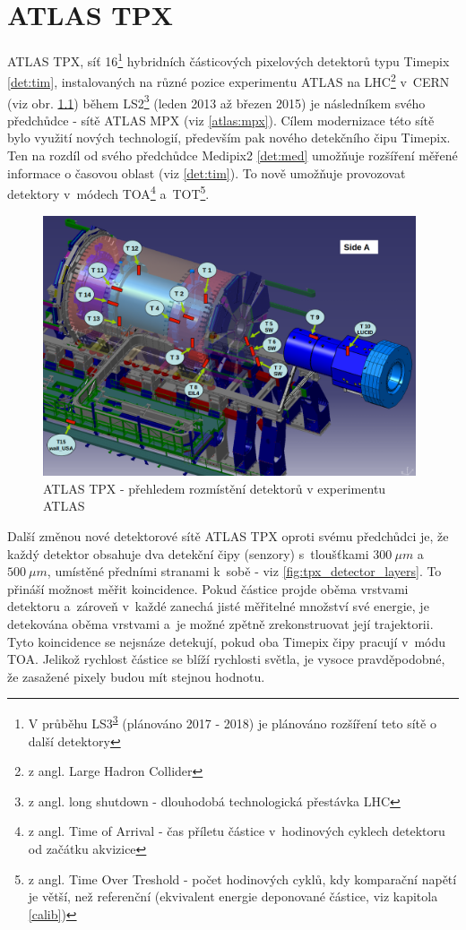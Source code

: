 

\chapter{ATLAS TPX}\label{atlas}
ATLAS TPX, síť 16\footnote{V průběhu LS3\textsuperscript{\ref{ls}} (plánováno 2017 - 2018) je plánováno rozšíření teto sítě o další detektory} hybridních částicových pixelových detektorů typu Timepix \ref{det:tim}, instalovaných na různé pozice experimentu ATLAS na LHC\footnote{z angl. Large Hadron Collider} v~CERN (viz obr. \ref{fig:tpx_positions}) během LS2\footnote{\label{ls}z angl. long shutdown - dlouhodobá technologická přestávka LHC} (leden 2013 až březen 2015) je následníkem svého předchůdce - sítě ATLAS MPX (viz \ref{atlas:mpx}). Cílem modernizace této sítě bylo využití nových technologií, především pak nového detekčního čipu Timepix. Ten na rozdíl od svého předchůdce Medipix2 \ref{det:med} umožňuje rozšíření měřené informace o časovou oblast (viz \ref{det:tim}). To nově umožňuje provozovat detektory v~módech TOA\footnote{z angl. Time of Arrival - čas příletu částice v~hodinových cyklech detektoru od začátku akvizice} a~TOT\footnote{z angl. Time Over Treshold - počet hodinových cyklů, kdy komparační napětí je větší, než referenční (ekvivalent energie deponované částice, viz kapitola \ref{calib})}. 


\begin{figure}[th!]
	\begin{center}
		\includegraphics[width=11cm]{figures/tpx_positions.png}
		\caption{ATLAS TPX - přehledem rozmístění detektorů v experimentu ATLAS}
		\label{fig:tpx_positions}
	\end{center}
\end{figure}


Další změnou nové detektorové sítě ATLAS TPX oproti svému předchůdci je, že každý detektor obsahuje dva detekční čipy (senzory) s~tloušťkami $300~\mu m$ a~$500~\mu m$, umístěné předními stranami k~sobě - viz \ref{fig:tpx_detector_layers}. To přináší možnost měřit koincidence. Pokud částice projde oběma vrstvami  detektoru a~zároveň v~každé zanechá jisté měřitelné množství své energie, je detekována oběma vrstvami a~je možné zpětně zrekonstruovat její trajektorii. Tyto koincidence se nejsnáze detekují, pokud oba Timepix čipy pracují v~módu TOA. Jelikož rychlost částice se blíží rychlosti světla, je vysoce pravděpodobné, že zasažené pixely budou mít stejnou hodnotu.


